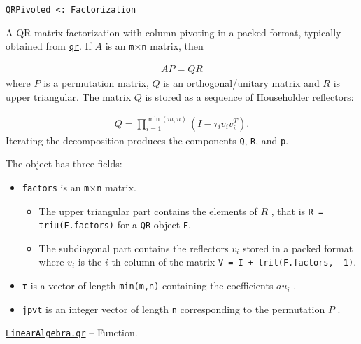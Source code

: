 \begin{adjustwidth}{2em}{0pt}


\begin{verbatim}
QRPivoted <: Factorization
\end{verbatim}

A QR matrix factorization with column pivoting in a packed format, typically obtained from \hyperlink{4122539696772350360}{\texttt{qr}}. If  \(A\)  is an \texttt{m}×\texttt{n} matrix, then

\begin{equation*}
\begin{split}A P = Q R\end{split}\end{equation*}
where  \(P\)  is a permutation matrix,  \(Q\)  is an orthogonal/unitary matrix and  \(R\)  is upper triangular. The matrix  \(Q\)  is stored as a sequence of Householder reflectors:

\begin{equation*}
\begin{split}Q = \prod_{i=1}^{\min(m,n)} (I - \tau_i v_i v_i^T).\end{split}\end{equation*}
Iterating the decomposition produces the components \texttt{Q}, \texttt{R}, and \texttt{p}.

The object has three fields:

\begin{itemize}
\item \texttt{factors} is an \texttt{m}×\texttt{n} matrix.

\begin{itemize}
\item The upper triangular part contains the elements of  \(R\) , that is \texttt{R = triu(F.factors)} for a \texttt{QR} object \texttt{F}.


\item The subdiagonal part contains the reflectors  \(v_i\)  stored in a packed format where  \(v_i\)  is the  \(i\) th column of the matrix \texttt{V = I + tril(F.factors, -1)}.

\end{itemize}

\item \texttt{τ} is a vector of length \texttt{min(m,n)} containing the coefficients  \(au_i\) .


\item \texttt{jpvt} is an integer vector of length \texttt{n} corresponding to the permutation  \(P\) .

\end{itemize}


\end{adjustwidth}
\hypertarget{4122539696772350360}{} 
\hyperlink{4122539696772350360}{\texttt{LinearAlgebra.qr}}  -- {Function.}

